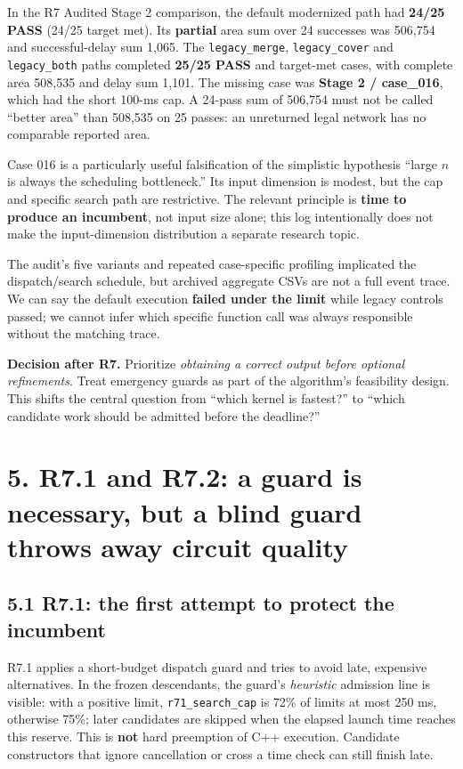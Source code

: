 In the R7 Audited Stage 2 comparison, the default modernized path had \textbf{24/25 PASS} (24/25 target met). Its \textbf{partial} area sum over 24 successes was 506,754 and successful-delay sum 1,065. The \texttt{legacy\_merge}, \texttt{legacy\_cover} and \texttt{legacy\_both} paths completed \textbf{25/25 PASS} and target-met cases, with complete area 508,535 and delay sum 1,101. The missing case was \textbf{Stage 2 / case\_016}, which had the short 100-ms cap. A 24-pass sum of 506,754 must not be called ``better area'' than 508,535 on 25 passes: an unreturned legal network has no comparable reported area.

Case 016 is a particularly useful falsification of the simplistic hypothesis ``large \(n\) is always the scheduling bottleneck.'' Its input dimension is modest, but the cap and specific search path are restrictive. The relevant principle is \textbf{time to produce an incumbent}, not input size alone; this log intentionally does not make the input-dimension distribution a separate research topic.

The audit's five variants and repeated case-specific profiling implicated the dispatch/search schedule, but archived aggregate CSVs are not a full event trace. We can say the default execution \textbf{failed under the limit} while legacy controls passed; we cannot infer which specific function call was always responsible without the matching trace.

\textbf{Decision after R7.} Prioritize \emph{obtaining a correct output before optional refinements}. Treat emergency guards as part of the algorithm's feasibility design. This shifts the central question from ``which kernel is fastest?'' to ``which candidate work should be admitted before the deadline?''

\section{5. R7.1 and R7.2: a guard is necessary, but a blind guard throws away circuit quality}\label{r7.1-and-r7.2-a-guard-is-necessary-but-a-blind-guard-throws-away-circuit-quality}

\subsection{5.1 R7.1: the first attempt to protect the incumbent}\label{r7.1-the-first-attempt-to-protect-the-incumbent}

R7.1 applies a short-budget dispatch guard and tries to avoid late, expensive alternatives. In the frozen descendants, the guard's \emph{heuristic} admission line is visible: with a positive limit, \texttt{r71\_search\_cap} is 72\% of limits at most 250 ms, otherwise 75\%; later candidates are skipped when the elapsed launch time reaches this reserve. This is \textbf{not} hard preemption of C++ execution. Candidate constructors that ignore cancellation or cross a time check can still finish late.

